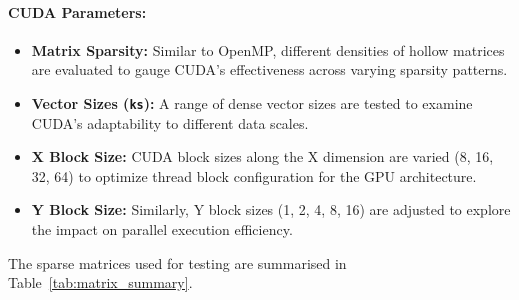 \documentclass[12pt,oneside]{book} %
\begin{document}
\paragraph{CUDA Parameters:}
\begin{itemize}
    \item \textbf{Matrix Sparsity:} Similar to OpenMP, different densities of hollow matrices are evaluated to gauge CUDA’s effectiveness across varying sparsity patterns.
    \item \textbf{Vector Sizes (\texttt{ks}):} A range of dense vector sizes are tested to examine CUDA's adaptability to different data scales.
    \item \textbf{X Block Size:} CUDA block sizes along the X dimension are varied (8, 16, 32, 64) to optimize thread block configuration for the GPU architecture.
    \item \textbf{Y Block Size:} Similarly, Y block sizes (1, 2, 4, 8, 16) are adjusted to explore the impact on parallel execution efficiency.
\end{itemize}

The sparse matrices used for testing are summarised in
Table~\ref{tab:matrix_summary}.
\end{document}
